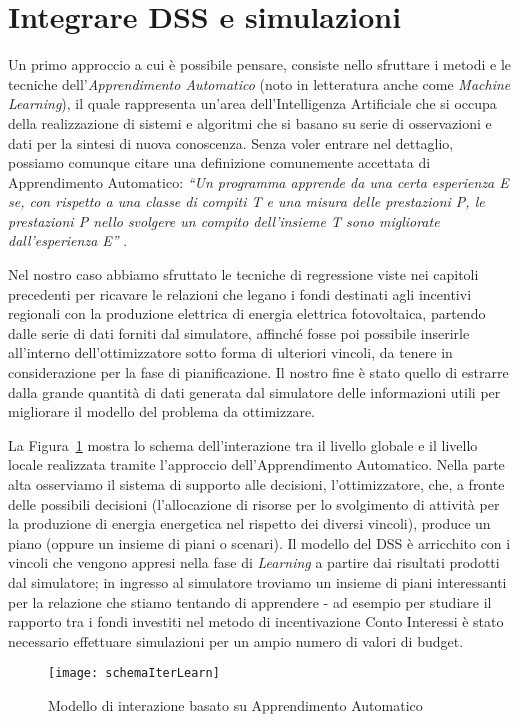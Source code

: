 \section{Integrare DSS e simulazioni}
Un primo approccio a cui è possibile pensare, consiste nello sfruttare i metodi e le tecniche dell'\emph{Apprendimento Automatico} (noto in letteratura anche come \emph{Machine Learning}), il quale rappresenta un'area dell'Intelligenza Artificiale che si occupa della realizzazione di sistemi e algoritmi che si basano su serie di osservazioni e dati per la sintesi di nuova conoscenza. Senza voler entrare nel dettaglio, possiamo comunque citare una definizione comunemente accettata di Apprendimento Automatico: \emph{``Un programma apprende da una certa esperienza E se, con rispetto a una classe di compiti T e una misura delle prestazioni P, le prestazioni P nello svolgere un compito dell'insieme T sono migliorate dall'esperienza E''} \cite{Mitchell}.
 
Nel nostro caso abbiamo sfruttato le tecniche di regressione viste nei capitoli precedenti per ricavare le relazioni che legano i fondi destinati agli incentivi regionali con la produzione elettrica di energia elettrica fotovoltaica, partendo dalle serie di dati forniti dal simulatore, affinché fosse poi possibile inserirle all'interno dell'ottimizzatore sotto forma di ulteriori vincoli, da tenere in considerazione per la fase di pianificazione. Il nostro fine è stato quello di estrarre dalla grande quantità di dati generata dal simulatore delle informazioni utili per migliorare il modello del problema da ottimizzare.

La Figura~\ref{schemaIterLearn} mostra lo schema dell'interazione tra il livello globale e il livello locale realizzata tramite l'approccio dell'Apprendimento Automatico. Nella parte alta osserviamo il sistema di supporto alle decisioni, l'ottimizzatore, che, a fronte delle possibili decisioni (l'allocazione di risorse per lo svolgimento di attività per la produzione di energia energetica nel rispetto dei diversi vincoli), produce un piano (oppure un insieme di piani o scenari). Il modello del DSS è arricchito con i vincoli che vengono appresi nella fase di \emph{Learning} a partire dai risultati prodotti dal simulatore; in ingresso al simulatore troviamo un insieme di piani interessanti per la relazione che stiamo tentando di apprendere - ad esempio per studiare il rapporto tra i fondi investiti nel metodo di incentivazione Conto Interessi è stato necessario effettuare simulazioni per un ampio numero di valori di budget. 
\begin{figure}[htb]
	\begin{center}
	\texttt{[image: schemaIterLearn]}
	\end{center}
	\caption{Modello di interazione basato su Apprendimento Automatico}
  	\label{schemaIterLearn}
\end{figure}


